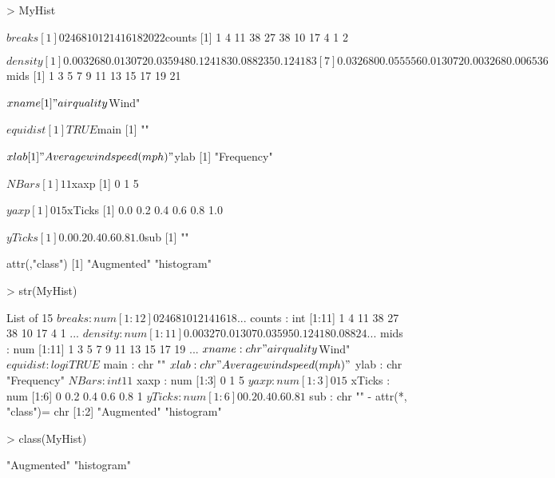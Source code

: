 \begin{Schunk}
\begin{Sinput}
> MyHist 
\end{Sinput}
\begin{Soutput}
$breaks
 [1]  0  2  4  6  8 10 12 14 16 18 20 22

$counts
 [1]  1  4 11 38 27 38 10 17  4  1  2

$density
 [1] 0.003268 0.013072 0.035948 0.124183 0.088235 0.124183
 [7] 0.032680 0.055556 0.013072 0.003268 0.006536

$mids
 [1]  1  3  5  7  9 11 13 15 17 19 21

$xname
[1] "airquality$Wind"

$equidist
[1] TRUE

$main
[1] ""

$xlab
[1] "Average wind speed (mph)"

$ylab
[1] "Frequency"

$NBars
[1] 11

$xaxp
[1] 0 1 5

$yaxp
[1] 0 1 5

$xTicks
[1] 0.0 0.2 0.4 0.6 0.8 1.0

$yTicks
[1] 0.0 0.2 0.4 0.6 0.8 1.0

$sub
[1] ""

attr(,"class")
[1] "Augmented" "histogram"
\end{Soutput}
\begin{Sinput}
> str(MyHist) 
\end{Sinput}
\begin{Soutput}
List of 15
 $ breaks  : num [1:12] 0 2 4 6 8 10 12 14 16 18 ...
 $ counts  : int [1:11] 1 4 11 38 27 38 10 17 4 1 ...
 $ density : num [1:11] 0.00327 0.01307 0.03595 0.12418 0.08824 ...
 $ mids    : num [1:11] 1 3 5 7 9 11 13 15 17 19 ...
 $ xname   : chr "airquality$Wind"
 $ equidist: logi TRUE
 $ main    : chr ""
 $ xlab    : chr "Average wind speed (mph)"
 $ ylab    : chr "Frequency"
 $ NBars   : int 11
 $ xaxp    : num [1:3] 0 1 5
 $ yaxp    : num [1:3] 0 1 5
 $ xTicks  : num [1:6] 0 0.2 0.4 0.6 0.8 1
 $ yTicks  : num [1:6] 0 0.2 0.4 0.6 0.8 1
 $ sub     : chr ""
 - attr(*, "class")= chr [1:2] "Augmented" "histogram"
\end{Soutput}
\begin{Sinput}
> class(MyHist) 
\end{Sinput}
\begin{Soutput}
[1] "Augmented" "histogram"
\end{Soutput}
\end{Schunk}
 
